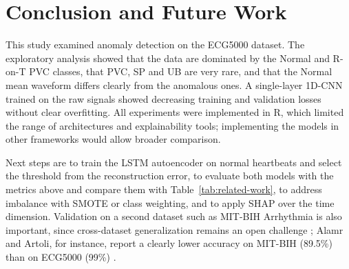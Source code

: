 \documentclass[conference]{IEEEtran}
\begin{document}
\section{Conclusion and Future Work}

This study examined anomaly detection on the ECG5000 dataset. The exploratory analysis showed that the data are dominated by the Normal and R-on-T PVC classes, that PVC, SP and UB are very rare, and that the Normal mean waveform differs clearly from the anomalous ones. A single-layer 1D-CNN trained on the raw signals showed decreasing training and validation losses without clear overfitting. All experiments were implemented in R, which limited the range of architectures and explainability tools; implementing the models in other frameworks would allow broader comparison.

Next steps are to train the LSTM autoencoder on normal heartbeats and select the threshold from the reconstruction error, to evaluate both models with the metrics above and compare them with Table~\ref{tab:related-work}, to address imbalance with SMOTE or class weighting, and to apply SHAP over the time dimension. Validation on a second dataset such as MIT-BIH Arrhythmia is also important, since cross-dataset generalization remains an open challenge \citep{adegoke2025,wu2025}; Alamr and Artoli, for instance, report a clearly lower accuracy on MIT-BIH (89.5\%) than on ECG5000 (99\%) \citep{alamr2023}.
\end{document}
